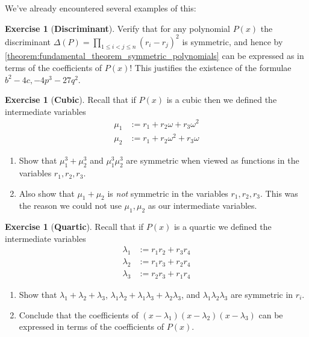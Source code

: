 \documentclass[reqno, 12pt, letter]{article}
\theoremstyle{plain}
\theoremstyle{definition}
\newtheorem{exercise}[theorem]{Exercise}
\theoremstyle{remark}
\numberwithin{equation}{section}
\begin{document}
	We've already encountered several examples of this:
	\begin{exercise}[\textbf{Discriminant}]
		Verify that for any polynomial $ P(x)$ the discriminant $\Delta(P) = \prod_{1 \leq i < j \leq n} (r_i - r_j)^2$ is symmetric, and hence by \autoref{theorem:fundamental_theorem_symmetric_polynomials} can be expressed as in terms of the coefficients of $ P(x)$! This justifies the existence of the formulae $ b^2 - 4c, -4p^3 - 27q^2$.
	\end{exercise}
	
	\begin{exercise}[\textbf{Cubic}] Recall that if $ P(x)$ is a cubic then we defined the intermediate variables \begin{align*}
    \mu_1 &:= r_1 + r_2 \omega + r_3 \omega^2 \\
    \mu_2 &:= r_1 + r_2 \omega^2 + r_3 \omega
  \end{align*}
		\begin{enumerate}
			\item Show that $ \mu_1^3 + \mu_2^3 $ and $ \mu_1^3  \mu_2^3$ are symmetric when viewed as functions in the variables $r_1, r_2, r_3$.
			\item Also show that $ \mu_1 + \mu_2$ is \emph{not} symmetric in the variables $r_1, r_2, r_3$. 
				This was the reason we could not use $ \mu_1, \mu_2$ as our intermediate variables.
		\end{enumerate}
	\end{exercise}
	
	\begin{exercise}[\textbf{Quartic}]
		\label{exercise:quartic-lambda}
		Recall that if $ P(x)$ is a quartic we defined the intermediate variables
		\begin{align*}
				\lambda_1 &:= r_1 r_2 + r_3 r_4 \\
				\lambda_2 &:= r_1 r_3 + r_2 r_4 \\
				\lambda_3 &:= r_2 r_3 + r_1 r_4 
		\end{align*}
			\begin{enumerate}
			\item Show that $ \lambda_1 + \lambda_2 + \lambda_3$, $ \lambda_1 \lambda_2 + \lambda_1 \lambda_3 + \lambda_2 \lambda_3$, and $ \lambda_1 \lambda_2 \lambda_3$ are symmetric in $r_i$. 
			\item Conclude that the coefficients of $ (x-\lambda_1)(x-\lambda_2)(x-\lambda_3)$ can be expressed in terms of the coefficients of $ P(x)$.
		\end{enumerate}
	\end{exercise}
	
\end{document}
